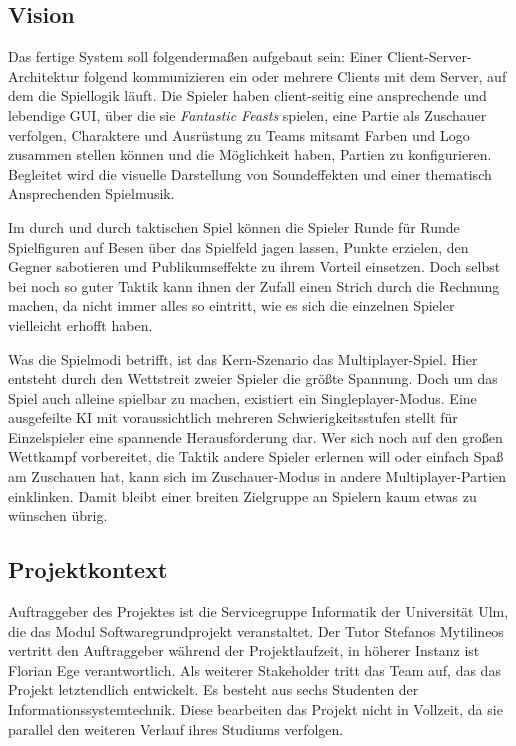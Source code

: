 \subsection{Vision}
Das fertige System soll folgendermaßen aufgebaut sein: Einer Client-Server-Architektur folgend kommunizieren ein oder mehrere Clients mit dem Server, auf dem die Spiellogik läuft. Die Spieler haben client-seitig eine ansprechende und lebendige GUI, über die sie \textit{Fantastic Feasts} spielen, eine Partie als Zuschauer verfolgen, Charaktere und Ausrüstung zu Teams mitsamt Farben und Logo zusammen stellen können und die Möglichkeit haben, Partien zu konfigurieren. Begleitet wird die visuelle Darstellung von Soundeffekten und einer thematisch Ansprechenden Spielmusik.

Im durch und durch taktischen Spiel können die Spieler Runde für Runde Spielfiguren auf Besen über das Spielfeld jagen lassen, Punkte erzielen, den Gegner sabotieren und Publikumseffekte zu ihrem Vorteil einsetzen. Doch selbst bei noch so guter Taktik kann ihnen der Zufall einen Strich durch die Rechnung machen, da nicht immer alles so eintritt, wie es sich die einzelnen Spieler vielleicht erhofft haben.

Was die Spielmodi betrifft, ist das Kern-Szenario das Multiplayer-Spiel. Hier entsteht durch den Wettstreit zweier Spieler die größte Spannung. Doch um das Spiel auch alleine spielbar zu machen, existiert ein Singleplayer-Modus. Eine ausgefeilte KI mit voraussichtlich mehreren Schwierigkeitsstufen stellt für Einzelspieler eine spannende Herausforderung dar. Wer sich noch auf den großen Wettkampf vorbereitet, die Taktik andere Spieler erlernen will oder einfach Spaß am Zuschauen hat, kann sich im Zuschauer-Modus in andere Multiplayer-Partien einklinken. Damit bleibt einer breiten Zielgruppe an Spielern kaum etwas zu wünschen übrig.

\subsection{Projektkontext}
Auftraggeber des Projektes ist die Servicegruppe Informatik der Universität Ulm, die das Modul Softwaregrundprojekt veranstaltet. Der Tutor Stefanos Mytilineos vertritt den Auftraggeber während der Projektlaufzeit, in höherer Instanz ist Florian Ege verantwortlich. Als weiterer Stakeholder tritt das Team auf, das das Projekt letztendlich entwickelt. Es besteht aus sechs Studenten der Informationssystemtechnik. Diese bearbeiten das Projekt nicht in Vollzeit, da sie parallel den weiteren Verlauf ihres Studiums verfolgen. 

